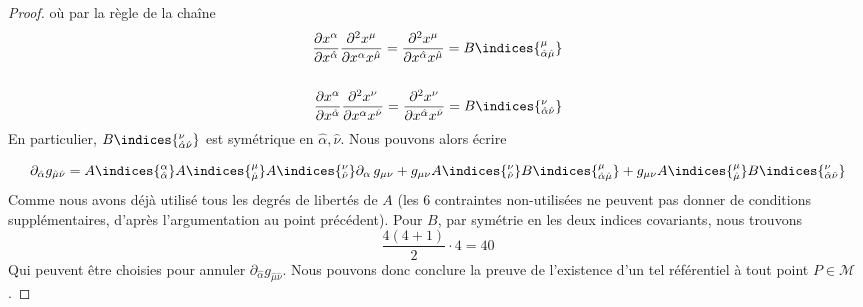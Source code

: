 \begin{proof}
où par la règle de la chaîne 
\begin{align}
\frac{\partial x^{\alpha}}{\partial x^{\hat{\alpha}}} \frac{\partial^2 x^{\mu}}{\partial x^{\alpha}x^{\hat{\mu}}} = \frac{\partial^2 x^{\mu}}{\partial x^{\hat{\alpha}}x^{\hat{\mu}}} = B\indices{^{\mu}_{\hat{\alpha} \hat{\mu}}}\\
\nonumber
\, \\
\frac{\partial x^{\alpha}}{\partial x^{\hat{\alpha}}} \frac{\partial^2 x^{\nu}}{\partial x^{\alpha}x^{\hat{\nu}}} = \frac{\partial^2 x^{\nu}}{\partial x^{\hat{\alpha}}x^{\hat{\nu}}} = B\indices{^{\nu}_{\hat{\alpha} \hat{\nu}}}
\end{align}
En particulier, $B\indices{^{\nu}_{\hat{\alpha} \hat{\nu}}}$ est symétrique en $\hat{\alpha}, \hat{\nu}$. Nous pouvons alors écrire

\begin{equation}
    \partial_{\hat{\alpha}}g_{\hat{\mu}\hat{\nu}} = A\indices{^{\alpha}_{\hat{\alpha}}}A\indices{^{\mu}_{\hat{\mu}}}A\indices{^{\nu}_{\hat{\nu}}}\partial_{\alpha}\, g_{\mu \nu} + g_{\mu \nu}A\indices{^{\nu}_{\hat{\nu}}} B\indices{^{\mu}_{\hat{\alpha} \hat{\mu}}} + g_{\mu \nu}A\indices{^{\mu}_{\hat{\mu}}}B\indices{^{\nu}_{\hat{\alpha} \hat{\nu}}} 
\end{equation}
Comme nous avons déjà utilisé tous les degrés de libertés de $A$ (les 6 contraintes non-utilisées ne peuvent pas donner de conditions supplémentaires, d'après l'argumentation au point précédent). Pour $B$, par symétrie en les deux indices covariants, nous trouvons 
\begin{equation}
    \frac{4(4+1)}{2} \cdot 4 = 40
\end{equation}
Qui peuvent être choisies pour annuler $\partial_{\hat{\alpha}}g_{\hat{\mu}\hat{\nu}}$. Nous pouvons donc conclure la preuve de l'existence d'un tel référentiel à tout point $P\in \mathcal{M}$.
\end{proof}
